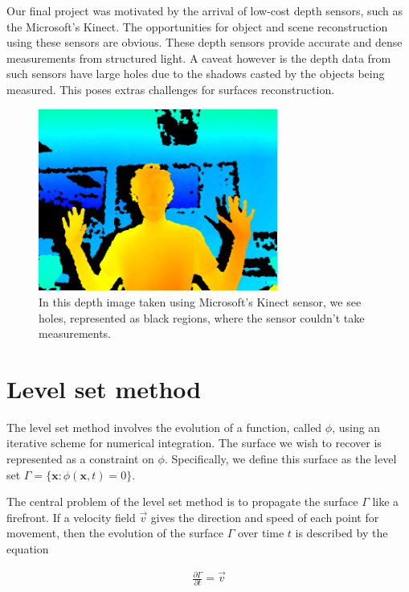 \documentclass{article}
\begin{document}
Our final project was motivated by the arrival of low-cost depth sensors, such
as the Microsoft's Kinect. The opportunities for object and scene
reconstruction using these sensors are obvious. These depth sensors provide
accurate and dense measurements from structured light. A caveat however is the
depth data from such sensors have large holes due to the shadows casted by the
objects being measured. This poses extras challenges for surfaces
reconstruction.

\begin{figure}
  \centering
  \includegraphics[width=0.7\textwidth]{img/depthmap.png}
  \caption{In this depth image taken using Microsoft's Kinect sensor, we see
holes, represented as black regions, where the sensor couldn't take
measurements.}

\end{figure}

\section{Level set method}
The level set method involves the evolution of a function, called $\phi$,
using an iterative scheme for numerical integration. The surface we wish to
recover is represented as a constraint on $\phi$. Specifically, we define this
surface as the level set $\Gamma=\{\mathbf{x}:\phi(\mathbf{x}, t)=0\}$.

The central problem of the level set method is to propagate the surface
$\Gamma$ like a firefront. If a velocity field $\vec{v}$ gives the direction
and speed of each point for movement, then the evolution of the surface
$\Gamma$ over time $t$ is described by the equation

\begin{align}
  \frac{\partial \Gamma}{\partial t} = \vec{v}
\end{align}
\end{document}
